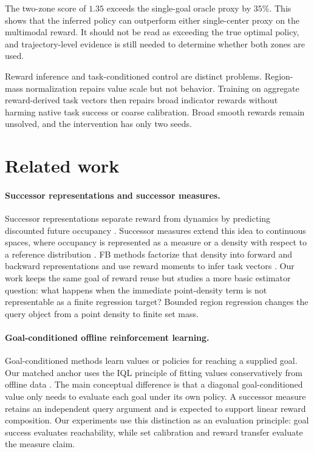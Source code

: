 \documentclass{article}
\begin{document}
The two-zone score of $1.35$ exceeds the single-goal oracle proxy by $35\%$. This
shows that the inferred policy can outperform either single-center proxy on the
multimodal reward. It should not be read as exceeding the true optimal policy, and
trajectory-level evidence is still needed to determine whether both zones are
used.

\begin{finding}
Reward inference and task-conditioned control are distinct problems. Region-mass
normalization repairs value scale but not behavior. Training on aggregate
reward-derived task vectors then repairs broad indicator rewards without harming
native task success or coarse calibration. Broad smooth rewards remain unsolved,
and the intervention has only two seeds.
\end{finding}

\section{Related work}
\label{sec:related}

\paragraph{Successor representations and successor measures.}
Successor representations separate reward from dynamics by predicting discounted
future occupancy \citep{dayan1993improving}. Successor measures extend this idea
to continuous spaces, where occupancy is represented as a measure or a density
with respect to a reference distribution \citep{blier2021learning}. FB methods
factorize that density into forward and backward representations and use reward
moments to infer task vectors \citep{touati2021learning,touati2023does}. Our work
keeps the same goal of reward reuse but studies a more basic estimator question:
what happens when the immediate point-density term is not representable as a
finite regression target? Bounded region regression changes the query object from
a point density to finite set mass.

\paragraph{Goal-conditioned offline reinforcement learning.}
Goal-conditioned methods learn values or policies for reaching a supplied goal.
Our matched anchor uses the IQL principle of fitting values conservatively from
offline data \citep{kostrikov2021offline}. The main conceptual difference is that
a diagonal goal-conditioned value only needs to evaluate each goal under its own
policy. A successor measure retains an independent query argument and is expected
to support linear reward composition. Our experiments use this distinction as an
evaluation principle: goal success evaluates reachability, while set calibration
and reward transfer evaluate the measure claim.
\end{document}
